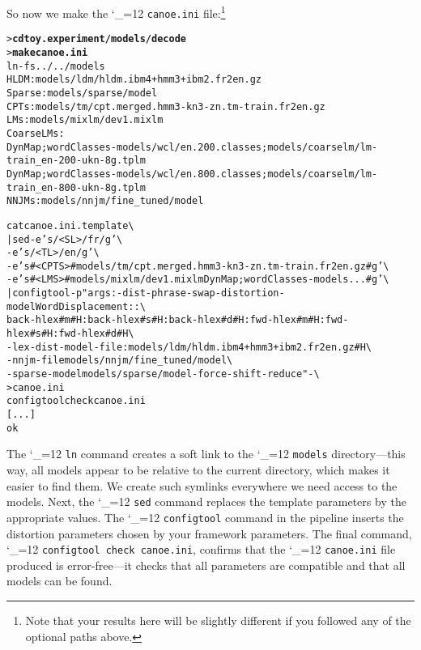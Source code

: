 \documentclass[11pt,letterpaper]{article}
\newcommand{\bs}{\textbackslash{}}
\def\code{\begingroup\catcode`\_=12 \codex}
\newcommand{\codex}[1]{\texttt{#1}\endgroup}
\begin{document}
So now we make the \code{canoe.ini} file:\footnote{Note that your results here
will be slightly different if you followed any of the optional paths above.}
\begin{small}
\begin{alltt}
   > \textbf{cd toy.experiment/models/decode}
   > \textbf{make canoe.ini}
   ln -fs ../../models
   HLDM: models/ldm/hldm.ibm4+hmm3+ibm2.fr2en.gz
   Sparse: models/sparse/model
   CPTs: models/tm/cpt.merged.hmm3-kn3-zn.tm-train.fr2en.gz
   LMs: models/mixlm/dev1.mixlm
   Coarse LMs:
      DynMap;wordClasses-models/wcl/en.200.classes;models/coarselm/lm-train_en-200-ukn-8g.tplm
      DynMap;wordClasses-models/wcl/en.800.classes;models/coarselm/lm-train_en-800-ukn-8g.tplm  
   NNJMs: models/nnjm/fine_tuned/model

   cat canoe.ini.template \bs
      | sed -e 's/<SL>/fr/g' \bs
            -e 's/<TL>/en/g' \bs
            -e 's#<CPTS>#models/tm/cpt.merged.hmm3-kn3-zn.tm-train.fr2en.gz#g' \bs
            -e 's#<LMS>#models/mixlm/dev1.mixlm DynMap;wordClasses-models...#g' \bs
      | configtool -p "args: -dist-phrase-swap -distortion-model WordDisplacement::\bs
        back-hlex#m#H:back-hlex#s#H:back-hlex#d#H:fwd-hlex#m#H:fwd-hlex#s#H:fwd-hlex#d#H \bs
        -lex-dist-model-file :models/ldm/hldm.ibm4+hmm3+ibm2.fr2en.gz#H \bs
        -nnjm-file models/nnjm/fine_tuned/model \bs
        -sparse-model models/sparse/model -force-shift-reduce " - \bs
      > canoe.ini
   configtool check canoe.ini
   [...]
   ok
\end{alltt}
\end{small}
The \code{ln} command creates a soft link to the \code{models} directory---this way, all
models appear to be relative to the current directory, which makes it easier to
find them.  We create such symlinks everywhere we need access to the models.
Next, the \code{sed} command replaces the template parameters by the appropriate
values.  The \code{configtool} command in the pipeline inserts the distortion
parameters chosen by your framework parameters.  The final command, \code{configtool check
canoe.ini}, confirms that the \code{canoe.ini} file produced is error-free---it
checks that all parameters are compatible and that all models can be found.
\end{document}
